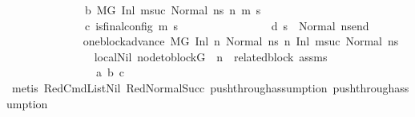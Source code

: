 \begin{isabellebody}
\ \ \ \ \ \ \ \ \ \ \ \ \ \ b{\isacharcolon}{\kern0pt}\ {\isachardoublequoteopen}M{\isacharcomma}{\kern0pt}{\isasymLambda}{\isacharcomma}{\kern0pt}{\isasymGamma}{\isacharcomma}{\kern0pt}{\isasymOmega}{\isacharcomma}{\kern0pt}G\ {\isasymturnstile}{\isacharparenleft}{\kern0pt}Inl\ msuc{}{\isacharcomma}{\kern0pt}\ Normal\ ns{}{\isacharparenright}{\kern0pt}\ {\isacharminus}{\kern0pt}n{\isasymrightarrow}{\isacharasterisk}{\kern0pt}\ {\isacharparenleft}{\kern0pt}m{\isacharprime}{\kern0pt}{\isacharcomma}{\kern0pt}\ s{\isacharprime}{\kern0pt}{\isacharparenright}{\kern0pt}{\isachardoublequoteclose}\ \isanewline
\ \ \ \ \ \ \ \ \ \ \ \ \ \ c{\isacharcolon}{\kern0pt}\ {\isachardoublequoteopen}is{\isacharunderscore}{\kern0pt}final{\isacharunderscore}{\kern0pt}config\ {\isacharparenleft}{\kern0pt}m{\isacharprime}{\kern0pt}{\isacharcomma}{\kern0pt}\ s{\isacharprime}{\kern0pt}{\isacharparenright}{\kern0pt}{\isachardoublequoteclose}\ \ \isanewline
\ \ \ \ \ \ \ \ \ \ \ \ \ \ d{\isacharcolon}{\kern0pt}\ {\isachardoublequoteopen}{\isacharparenleft}{\kern0pt}s{\isacharprime}{\kern0pt}\ {\isacharequal}{\kern0pt}\ Normal\ ns{\isacharunderscore}{\kern0pt}end{\isacharparenright}{\kern0pt}{\isachardoublequoteclose}\isanewline
\ \ \ \ \ \ \ \ \ \ \ \ \isamarkupfalse%
\ one{\isacharunderscore}{\kern0pt}block{\isacharunderscore}{\kern0pt}advance{\isacharcolon}{\kern0pt}\ {\isachardoublequoteopen}M{\isacharcomma}{\kern0pt}{\isasymLambda}{\isacharcomma}{\kern0pt}{\isasymGamma}{\isacharcomma}{\kern0pt}{\isasymOmega}{\isacharcomma}{\kern0pt}G\ {\isasymturnstile}{\isacharparenleft}{\kern0pt}Inl\ n{\isacharcomma}{\kern0pt}\ Normal\ ns{}{\isacharparenright}{\kern0pt}\ {\isacharminus}{\kern0pt}n{\isasymrightarrow}\ {\isacharparenleft}{\kern0pt}Inl\ msuc{}{\isacharcomma}{\kern0pt}\ Normal\ ns{}{\isacharparenright}{\kern0pt}{\isachardoublequoteclose}\ \isanewline
\ \ \ \ \ \ \ \ \ \ \ \ \ \ \isamarkupfalse%
\ local{\isachardot}{\kern0pt}Nil\ {\isacartoucheopen}node{\isacharunderscore}{\kern0pt}to{\isacharunderscore}{\kern0pt}block{\isacharparenleft}{\kern0pt}G{\isacharparenright}{\kern0pt}\ {\isacharbang}{\kern0pt}\ n\ {\isacharequal}{\kern0pt}\ related{\isacharunderscore}{\kern0pt}block{\isacartoucheclose}\ assms{\isacharparenleft}{\kern0pt}{}{\isacharparenright}{\kern0pt}\ \isanewline
\ \ \ \ \ \ \ \ \ \ \ \ \ \ \ \ a\ b\ c\isanewline
\ \ \ \ \ \ \ \ \ \ \ \ \ \ \isamarkupfalse%
\ {\isacharparenleft}{\kern0pt}metis\ RedCmdListNil\ RedNormalSucc\ push{\isacharunderscore}{\kern0pt}through{\isacharunderscore}{\kern0pt}assumption{}\ push{\isacharunderscore}{\kern0pt}through{\isacharunderscore}{\kern0pt}assumption{}{\isacharparenright}{\kern0pt}\ \ \isanewline

\end{isabellebody}

